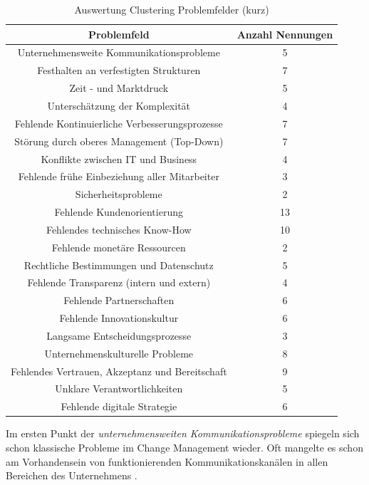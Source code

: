 \begin{table}[ht]
	\centering
	\caption{Auswertung Clustering Problemfelder (kurz)}
	\begin{tabular}{|c|c|}
		\hline
		\textbf{Problemfeld}& \textbf{Anzahl Nennungen} \\
		\hline
		Unternehmensweite Kommunikationsprobleme        & 5  \\
		Festhalten an verfestigten Strukturen           & 7  \\
		Zeit - und Marktdruck                           & 5  \\
		Unterschätzung der Komplexität                  & 4  \\
		Fehlende Kontinuierliche Verbesserungsprozesse  & 7  \\
		Störung durch oberes Management (Top-Down)      & 7  \\
		Konflikte zwischen IT und Business              & 4  \\
		Fehlende frühe Einbeziehung aller Mitarbeiter   & 3  \\
		Sicherheitsprobleme                             & 2  \\
		Fehlende Kundenorientierung                     & 13 \\
		Fehlendes technisches Know-How                  & 10 \\
		Fehlende monetäre Ressourcen                    & 2  \\
		Rechtliche Bestimmungen und Datenschutz         & 5  \\
		Fehlende Transparenz (intern und extern)        & 4  \\
		Fehlende Partnerschaften                        & 6  \\
		Fehlende Innovationskultur                      & 6  \\
		Langsame Entscheidungsprozesse                  & 3  \\
		Unternehmenskulturelle Probleme                 & 8  \\
		Fehlendes Vertrauen, Akzeptanz und Bereitschaft & 9  \\
		Unklare Verantwortlichkeiten                    & 5  \\
		Fehlende digitale Strategie                     & 6 \\
		\hline
	\end{tabular}
	\label{tab:clusteringpfshort}
\end{table}


Im ersten Punkt der \textit{unternehmensweiten Kommunikationsprobleme} spiegeln sich schon klassische Probleme im Change Management wieder. Oft mangelte es schon am Vorhandensein von funktionierenden Kommunikationskanälen in allen Bereichen des Unternehmens \cite[S. 234]{muchna_aspekte_2018}. 

